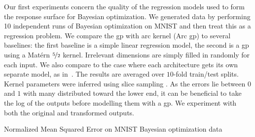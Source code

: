 \documentclass{article}
\newcommand{\note}[1]{}
\newcommand{\gp}{{\sc gp}}
\newcommand{\agp}{Arc \gp}
\begin{document}
Our first experiments concern the quality of the regression models used to form the response surface for Bayesian optimization. We generated data by performing 10 independent runs of Bayesian optimization on MNIST and then treat this as a regression problem. We compare the \gp{} with arc kernel (\agp) to several baselines: the first baseline is a simple linear regression model, the second is a \gp{} using a Mat\'{e}rn $\nicefrac{5}{2}$ kernel. Irrelevant dimensions are simply filled in randomly for each input. We also compare to the case where each architecture gets its own separate model, as in~\cite{bergstra2011algorithms}. The results are averaged over $10$-fold train/test splits. Kernel parameters were inferred using slice sampling \cite{Murray-Adams-2010a}. As the errors lie between $0$ and $1$ with many distributed toward the lower end, it can be beneficial to take the log of the outputs before modelling them with a \gp{}. We experiment with both the original and transformed outputs.

%
%



\begin{table}[h!]
\caption{{\small Normalized Mean Squared Error on MNIST Bayesian optimization data\label{tab:nn_error}}}
\label{tbl:nn_nmse}

%
\end{table}
\end{document}
